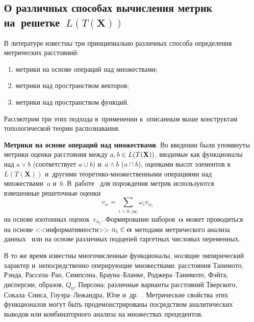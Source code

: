 \begin{multicols}{2}
\section{О различных способах вычисления метрик на~решетке~$L(T(\mathbf{X}))$}
    
В литературе известны три принципиально различных способа определения 
метрических расстояний:
\begin{enumerate}[(1)]
\item метрики на основе операций над мно\-же\-ст\-вами; 
\item метрики над пространством векторов; 
\item метрики над пространством 
функций. 
\end{enumerate}
Рассмотрим три этих подхода в~применении к~описанным выше 
конструктам топологической теории распознавания.

    
\textbf{Метрики на основе операций над множествами}. Во введении были 
упомянуты метрики оценки расстояния между $a,b \hm\in L(T(\mathbf{X}))$, 
вводимые как функционалы над $a\vee b$ (соответствует $a\cup b$) и~$a\wedge 
b$ ($a\cap b$), оценками высот элементов в~$L(T(\mathbf{X}))$ и~другими  
тео\-ре\-ти\-ко-мно\-жест\-вен\-ны\-ми операциями над множествами~$a$ и~$b$. 
В~работе~\cite{4-tr} для порождения мет\-рик используются взвешенные 
решеточные оценки 
$$
v_\alpha = \sum\limits_{i=0,\vert\bm{\alpha}\vert} 
\omega_i v_{\alpha_i}
$$ 
на основе изотонных оценок~$v_{\alpha_i}$. 
Формирование наборов~$\bm{\alpha}$ может проводиться на основе 
<<информативности>> $\alpha_i\hm\in \bm{\alpha}$ методами метрического 
анализа данных~\cite{7-tr} или на основе различных подцепей таргетных 
числовых переменных.
     
     В то же время известны многочисленные функционалы, носящие 
эмпирический характер и~непосредственно оперирующие множествами: 
расстояния Танимото, Рэнда, Рас\-се\-ла--Рао, Симпсона, Бра\-уна--Блан\-ке,  
Род\-же\-ра--Та\-ни\-мо\-то, Фэйта, дисперсии, образов, $Q_0$, Пирсона; 
различные варианты расстояний Тверского, Со\-ка\-ла--Сни\-са, Гоу\-эра--Ле\-жанд\-ра, Юле и~др.~\cite{8-tr}. Метрические свойства этих функционалов 
могут быть продемонстрированы посредством аналитических выводов или 
комбинаторного анализа на множествах прецедентов.
    

\end{multicols}
